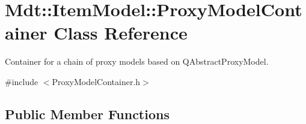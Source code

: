 \hypertarget{class_mdt_1_1_item_model_1_1_proxy_model_container}{}\section{Mdt\+:\+:Item\+Model\+:\+:Proxy\+Model\+Container Class Reference}
\label{class_mdt_1_1_item_model_1_1_proxy_model_container}


Container for a chain of proxy models based on Q\+Abstract\+Proxy\+Model.  




{\ttfamily \#include $<$Proxy\+Model\+Container.\+h$>$}

\subsection*{Public Member Functions}

